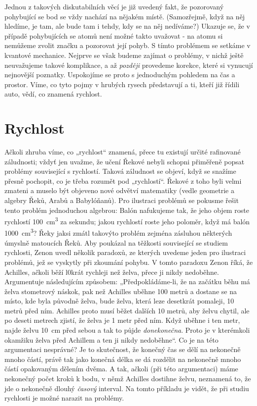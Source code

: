 {    Jednou z takových diskutabilních věcí je již uvedený fakt, že pozorovaný pohybující se bod se 
    vždy nachází na nějakém místě. (Samozřejmě, když na něj hledíme, je tam, ale bude tam i tehdy, 
    kdy se na něj nedíváme?) Ukazuje se, že v případě pohybujících se atomů není možné takto 
    uvažovat - na atomu si nemůžeme zvolit značku a pozorovat její pohyb. S tímto problémem se 
    setkáme v kvantové mechanice. Nejprve se však budeme zajímat o problémy, v nichž ještě 
    neuvažujeme takové komplikace, a až \emph{později} provedeme korekce, které si vynucují 
    nejnovější poznatky. Uspokojíme se proto s jednoduchým pohledem na čas a prostor. Víme, co tyto 
    pojmy v hrubých rysech představují a ti, kteří již řídili auto, vědí, co znamená rychlost.
    
  \section{Rychlost}
    Ačkoli zhruba víme, co „rychlost“ znamená, přece tu existují určité rafinované záludnosti; 
    vždyť jen uvažme, že učení Řekové nebyli schopni přiměřeně popsat problémy související s 
    rychlostí. Taková záludnost se objeví, když se snažíme přesně pochopit, co je třeba rozumět pod 
    „rychlostí“. Řekové z toho byli velmi zmateni a muselo být objeveno nové odvětví matematiky 
    (vedle geometrie a algebry Řeků, Arabů a Babylóňanů). Pro ilustraci problémů se pokusme řešit 
    tento problém jednoduchou algebrou: Balón nafukujeme tak, že jeho objem roste rychlostí 
    \SI{100}{\cubic\cm} za sekundu; jakou rychlostí roste jeho poloměr, když má balón 
    \SI{1000}{\cubic\cm}? Řeky jaksi zmátl takovýto problém zejména zásluhou některých úmyslně 
    matoucích Řeků. Aby poukázal na těžkosti související se studiem rychlosti, Zenon uvedl několik 
    paradoxů, ze kterých uvedeme jeden pro ilustraci problémů, jež se vyskytly při zkoumání pohybu. 
    V tomto paradoxu Zenon říká, že Achilles, ačkoli běží l0krát rychleji než želva, přece ji nikdy 
    nedoběhne. Argumentuje následujícím způsobem: „Předpokládáme-li, že na začátku běhu má želva 
    stometrový náskok, pak než Achilles uběhne \num{100} metrů a dostane se na místo, kde byla 
    původně želva, bude želva, která leze desetkrát pomaleji, \num{10} metrů před ním. Achilles 
    proto musí běžet dalších \num{10} metrů, aby želvu chytil, ale po deseti metrech zjistí, že 
    želva je \num{1} metr před ním. Když uběhne i ten metr, najde želvu \SI{10}{\cm} před sebou a 
    tak to půjde \emph{donekonečna}. Proto je v kterémkoli okamžiku želva před Achillem a ten ji 
    nikdy nedoběhne“. Co je na této argumentaci nesprávné? Je to skutečnost, že konečný čas se dělí 
    na nekonečně mnoho částí, právě tak jako konečná délka se dá rozdělit na nekonečně mnoho částí 
    opakovaným dělením dvěma. A tak, ačkoli (při této argumentaci) máme nekonečný počet kroků k 
    bodu, v němž Achilles dostihne želvu, neznamená to, že jde o nekonečně dlouhý \emph{časový} 
    interval. Na tomto příkladu je vidět, že při studiu rychlosti je možné narazit na problémy.
    
}
